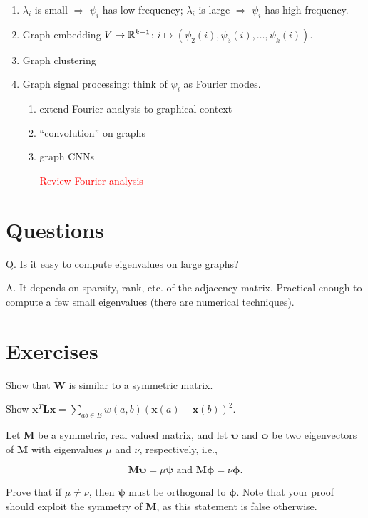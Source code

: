 \documentclass[11pt,letterpaper]{article}
\begin{document}
\begin{enumerate}[label=(\alph*)]
  \item $\lambda_i$ is small $\Longrightarrow$ $\psi_i$ has low frequency;
  $\lambda_i$ is large $\Longrightarrow$ $\psi_i$ has high frequency.

  \item Graph embedding $V \to \mathbb{R}^{k-1}$: $i \mapsto (\psi_2(i), \psi_3(i), \ldots, \psi_k(i))$.
  \item Graph clustering
  \item Graph signal processing: think of $\psi_i$ as Fourier modes.
  \begin{enumerate}[label=(\arabic*)]
    \item extend Fourier analysis to graphical context
    \item ``convolution'' on graphs
    \item graph CNNs
    
    \textcolor{red}{Review Fourier analysis}
  \end{enumerate}

\end{enumerate}

\section{Questions}

Q. Is it easy to compute eigenvalues on large graphs?

A. It depends on sparsity, rank, etc. of the adjacency matrix.
%
Practical enough to compute a few small eigenvalues (there are numerical techniques).

\section{Exercises}

\begin{exercise} Show that $\bm{W}$ is similar to a symmetric matrix.
\end{exercise}

\begin{exercise} Show $\bm{x}^T\bm{L}\bm{x} = \sum_{ab \in E} w(a,b)(\bm{x}(a) - \bm{x}(b))^2$.
\end{exercise}

\begin{exercise}
  Let $\bm{M}$ be a symmetric, real valued matrix, and let $\bm{\psi}$ and $\bm{\phi}$ be two eigenvectors of $\bm{M}$
  with eigenvalues $\mu$ and $\nu$, respectively, i.e.,

  $$\bm{M}\bm{\psi} = \mu \bm{\psi} \text{ and } \bm{M}\bm{\phi} = \nu \bm{\phi}.$$

  Prove that if $\mu \neq \nu$, then $\bm{\psi}$ must be orthogonal to $\bm{\phi}$.
  Note that your proof should exploit the symmetry of $\bm{M}$, as this statement is false otherwise.
\end{exercise}
\end{document}
